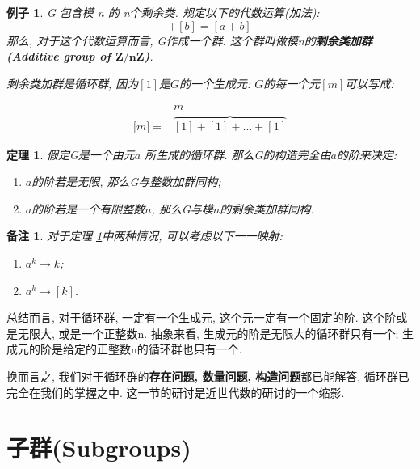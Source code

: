 \documentclass[utf8]{ctexbook}
\newtheorem{theorem}{定理}[section]
\newtheorem{memo}{备注}[section]
\newtheorem{example}{例子}[section]
\begin{document}
\begin{example}\label{example_additive_group_Z_nZ}
G 包含模 n 的 n个剩余类. 规定以下的代数运算(加法):
\begin{equation}
[a] + [b] = [a+b] \nonumber
\end{equation}
那么, 对于这个代数运算而言, G作成一个群. 这个群叫做模n的\textbf{剩余类加群(Additive group of $\mathbf{ Z/nZ}$)}.

剩余类加群是循环群, 因为$ [1] $是$G$的一个生成元: $G$的每一个元$ [m] $可以写成:

\begin{equation}\nonumber
\begin{array}{cc}
 & m \\ 
\lbrack m \rbrack = & \overbrace{[1] + [1] + ... + [1]} 
\end{array}
\end{equation}
\end{example}

\begin{theorem}\label{thm_cyclic_group}
假定G是一个由元$a$ 所生成的循环群. 那么G的构造完全由$a$的阶来决定:
\begin{enumerate}
\item{$a$的阶若是无限, 那么G与整数加群同构;}
\item{$a$的阶若是一个有限整数$n$, 那么G与模$n$的剩余类加群同构.}
\end{enumerate}
\end{theorem}

\begin{memo}
对于定理 \ref{thm_cyclic_group}中两种情况, 可以考虑以下一一映射:
\begin{enumerate}
\item{$a^k \longrightarrow k$;}
\item{$a^k \longrightarrow [ k ]$.}
\end{enumerate}
\end{memo}

总结而言, 对于循环群, 一定有一个生成元, 这个元一定有一个固定的阶. 这个阶或是无限大, 或是一个正整数n. 抽象来看, 生成元的阶是无限大的循环群只有一个; 生成元的阶是给定的正整数n的循环群也只有一个.

换而言之, 我们对于循环群的\textbf{存在问题, 数量问题, 构造问题}都已能解答, 循环群已完全在我们的掌握之中. 这一节的研讨是近世代数的研讨的一个缩影.

\section{子群(Subgroups)}
\end{document}
